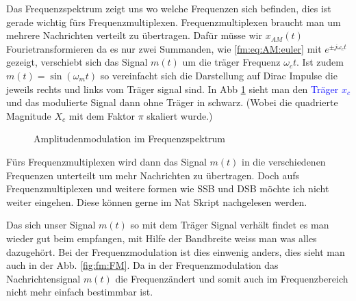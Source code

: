 Das Frequenzspektrum zeigt uns wo welche Frequenzen sich befinden, dies ist gerade wichtig fürs Frequenzmultiplexen.
Frequenzmultiplexen braucht man um mehrere Nachrichten verteilt zu übertragen.
Dafür müsse wir \(x_{AM}(t)\) Fourietransformieren da es nur zwei Summanden, wie \eqref{fm:eq:AM:euler} mit \(e^{\pm j\omega_ct}\)gezeigt, 
verschiebt sich das Signal \(m(t)\) um die träger Frequenz \(\omega_ct\).
Ist zudem \(m(t) = \sin(\omega_m t)\) so vereinfacht sich die Darstellung auf Dirac Impulse die jeweils rechts und links vom Träger signal sind.
In Abb \ref{fig:AM_frequency} sieht man den \textcolor{blue}{Träger $x_c$} und das modulierte Signal dann ohne Träger in schwarz.
(Wobei die quadrierte Magnitude $X_c$ mit dem Faktor $\pi$ skaliert wurde.)
\begin{figure}
	\centering
	
	\caption{Amplitudenmodulation im Frequenzspektrum}
	\label{fig:AM_frequency}
\end{figure}
Fürs Frequenzmultiplexen wird dann das Signal \(m(t)\) in die verschiedenen Frequenzen unterteilt um mehr Nachrichten zu übertragen.
Doch aufs Frequenzmultiplexen und weitere formen wie SSB und DSB möchte ich nicht weiter eingehen.
Diese können gerne im Nat Skript nachgelesen werden.\cite{fm:NAT}

Das sich unser Signal \(m(t)\)  so mit dem Träger Signal verhält findet es man wieder gut beim empfangen, mit Hilfe der Bandbreite weiss man was alles dazugehört.
Bei der Frequenzmodulation ist dies einwenig anders, dies sieht man auch in der Abb. \ref{fig:fm:FM}.
Da in der Frequenzmodulation das Nachrichtensignal \(m(t)\) die Frequenzändert und somit auch im Frequenzbereich nicht mehr einfach bestimmbar ist.
